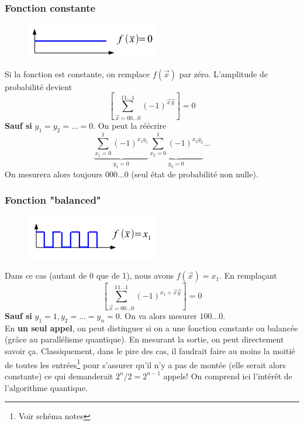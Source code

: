 \subsubsection{Fonction constante}
	\begin{figure}
	\vspace{-5mm}
	\includegraphics[scale=0.5]{ch1/image12}
	\end{figure}
Si la fonction est constante, on remplace $f(\vec{x})$ par zéro. L'amplitude de probabilité devient
\begin{equation}
\left[\sum_{\vec{x}=00\dots0}^{11\dots1} (-1)^{
\vec{x}\vec{y}}\right]=0
\end{equation}
\textbf{Sauf si} $y_1=y_2=\dots=0$. On peut la réécrire
\begin{equation}
\underbrace{\sum_{x_1=0}^1(-1)^{x_1y_1}}_{y_1=0}\underbrace{\sum_{x_2=0}^1(-1)^{x_2y_2}}_{y_2=0}\dots
\end{equation}
On mesurera alors toujours $000\dots0$ (seul état de probabilité non nulle).

\subsubsection{Fonction "balanced"}
	\begin{figure}
	\vspace{-5mm}
	\includegraphics[scale=0.5]{ch1/image13}
	\end{figure}
Dans ce cas (autant de 0 que de 1), nous avons $f(\vec{x})=x_1$. En remplaçant
\begin{equation}
\left[\sum_{\vec{x}=00\dots0}^{11\dots1} (-1)^{x_1+
\vec{x}\vec{y}}\right]=0
\end{equation}
\textbf{Sauf si} $y_1=1, y_2=\dots=y_n=0$. On va alors mesurer $100\dots0$.\\

En \textbf{un seul appel}, on peut distinguer si on a une fonction constante ou balancée (grâce au
parallélisme quantique). En mesurant la sortie, on peut directement savoir ça. Classiquement, dans
le pire des cas, il faudrait faire au moins la moitié de toutes les entrées\footnote{Voir schéma
notes} pour s'assurer qu'il n'y a pas de montée (elle serait alors constante) ce qui demanderait
$2^n/2=2^{n-1}$ appels! On comprend ici l'intérêt de l'algorithme quantique.


